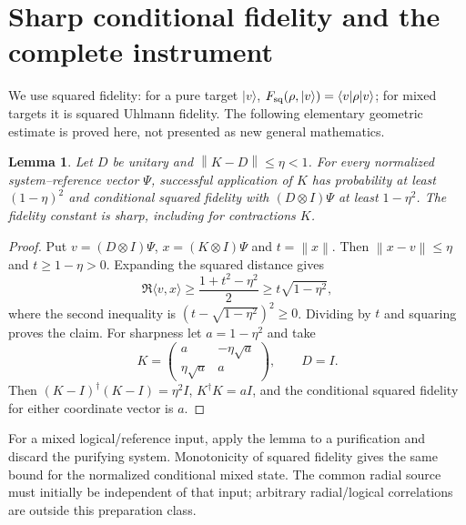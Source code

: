 \documentclass[11pt]{article}
\newtheorem{lemma}{Lemma}
\newcommand{\norm}[1]{\left\lVert#1\right\rVert}
\newcommand{\ket}[1]{\lvert#1\rangle}
\newcommand{\bra}[1]{\langle#1\rvert}
\begin{document}
\section{Sharp conditional fidelity and the complete instrument}
We use squared fidelity: for a pure target $\ket v$, $F_{\rm sq}(\rho,\ket v)=\bra v\rho\ket v$; for mixed targets it is squared Uhlmann fidelity.
The following elementary geometric estimate is proved here, not presented as new general mathematics.
\begin{lemma}\label{lem:sharp}
Let $D$ be unitary and $\norm{K-D}\leq\eta<1$.
For every normalized system--reference vector $\Psi$, successful application of $K$ has probability at least $(1-\eta)^2$ and conditional squared fidelity with $(D\otimes I)\Psi$ at least $1-\eta^2$.
The fidelity constant is sharp, including for contractions $K$.
\end{lemma}
\begin{proof}
Put $v=(D\otimes I)\Psi$, $x=(K\otimes I)\Psi$ and $t=\norm x$.
Then $\norm{x-v}\leq\eta$ and $t\geq1-\eta>0$.
Expanding the squared distance gives
\begin{equation}
 \Re\langle v,x\rangle\geq\frac{1+t^2-\eta^2}{2}
 \geq t\sqrt{1-\eta^2},\label{eq:tangent}
\end{equation}
where the second inequality is $(t-\sqrt{1-\eta^2})^2\geq0$.
Dividing by $t$ and squaring proves the claim.
For sharpness let $a=1-\eta^2$ and take
\begin{equation}
 K=\begin{pmatrix}a&-\eta\sqrt a\\\eta\sqrt a&a\end{pmatrix},\qquad D=I.
\end{equation}
Then $(K-I)^\dagger(K-I)=\eta^2I$, $K^\dagger K=aI$, and the conditional squared fidelity for either coordinate vector is $a$.
\end{proof}
For a mixed logical/reference input, apply the lemma to a purification and discard the purifying system.
Monotonicity of squared fidelity gives the same bound for the normalized conditional mixed state.
The common radial source must initially be independent of that input; arbitrary radial/logical correlations are outside this preparation class.
\end{document}
